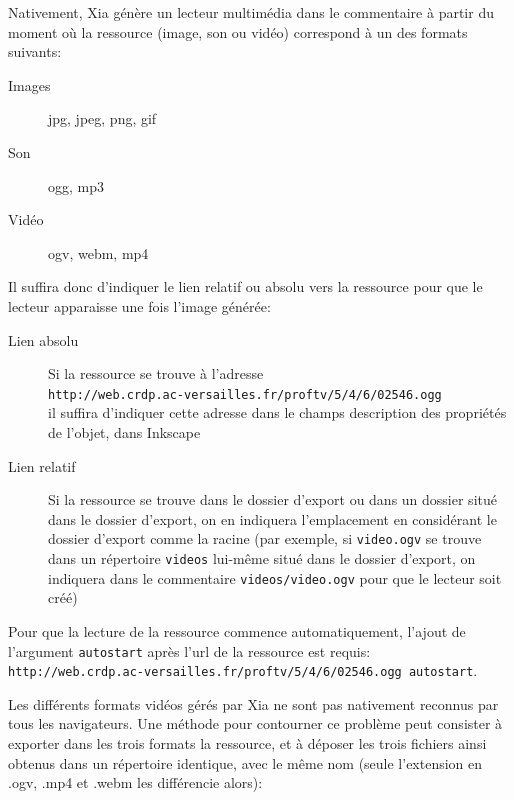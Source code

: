 \documentclass[a4paper,12pt]{report}
\begin{document}
Nativement, Xia génère un lecteur multimédia dans le commentaire à partir du moment où la ressource (image, son ou vidéo)
correspond à un des formats suivants:
\begin{description}
 \item [Images] jpg, jpeg, png, gif
 \item [Son] ogg, mp3
 \item [Vidéo] ogv, webm, mp4
\end{description}

Il suffira donc d'indiquer le lien relatif ou absolu vers la ressource pour que le lecteur apparaisse une fois l'image générée:
\begin{description}
 \item [Lien absolu] Si la ressource se trouve à l'adresse\\
 \verb|http://web.crdp.ac-versailles.fr/proftv/5/4/6/02546.ogg|\\
 il suffira d'indiquer cette adresse dans le champs description des propriétés de l'objet, dans Inkscape
 \item [Lien relatif] Si la ressource se trouve dans le dossier d'export ou dans un dossier situé dans le dossier d'export, on en indiquera
 l'emplacement en considérant le dossier d'export comme la racine
 (par exemple, si \verb|video.ogv| se trouve dans un répertoire \verb|videos| lui-même situé dans le dossier d'export, on indiquera dans
 le commentaire \verb|videos/video.ogv| pour que le lecteur soit créé)
\end{description}

Pour que la lecture de la ressource commence automatiquement, l'ajout de l'argument \verb|autostart| après l'url de la ressource est requis:\\
\verb|http://web.crdp.ac-versailles.fr/proftv/5/4/6/02546.ogg autostart|.

Les différents formats vidéos gérés par Xia ne sont pas nativement reconnus par tous les navigateurs.
Une méthode pour contourner ce problème peut consister à exporter dans les trois formats la ressource,
et à déposer les trois fichiers ainsi obtenus dans un répertoire identique, avec le même nom (seule l'extension
en .ogv, .mp4 et .webm les différencie alors):\\
\end{document}
